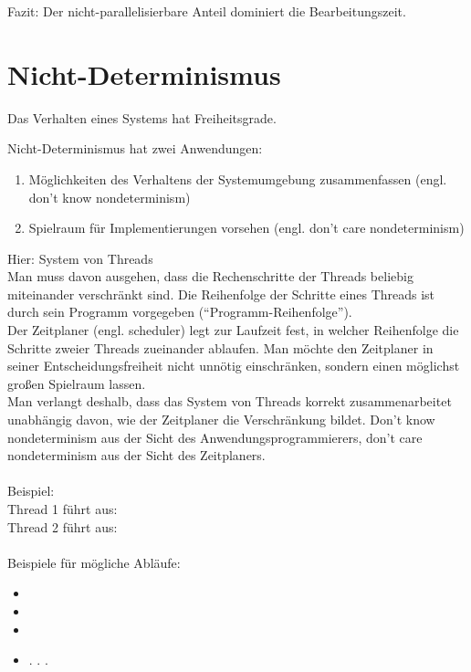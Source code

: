 Fazit: Der nicht-parallelisierbare Anteil dominiert die Bearbeitungszeit.

\section{Nicht-Determinismus}
\begin{definition}
Das Verhalten eines Systems hat Freiheitsgrade.
\end{definition}

Nicht-Determinismus hat zwei Anwendungen:
\begin{enumerate}
\item Möglichkeiten des Verhaltens der Systemumgebung zusammenfassen (engl. don't know nondeterminism)
\item Spielraum für Implementierungen vorsehen (engl. don't care nondeterminism)
\end{enumerate}

Hier: System von Threads\\
Man muss davon ausgehen, dass die Rechenschritte der Threads beliebig miteinander verschränkt sind. Die Reihenfolge der Schritte eines Threads ist durch sein Programm vorgegeben ("`Programm-Reihenfolge"').\\
Der Zeitplaner (engl. scheduler) legt zur Laufzeit fest, in welcher Reihenfolge die Schritte zweier Threads zueinander ablaufen. Man möchte den Zeitplaner in seiner Entscheidungsfreiheit nicht unnötig einschränken, sondern einen möglichst großen Spielraum lassen.\\
Man verlangt deshalb, dass das System von Threads korrekt zusammenarbeitet unabhängig davon, wie der Zeitplaner die Verschränkung bildet. Don't know nondeterminism aus der Sicht des Anwendungsprogrammierers, don't care nondeterminism aus der Sicht des Zeitplaners.\\
\\
Beispiel:\\
Thread 1 führt aus:   \\
Thread 2 führt aus:   \\
\\
Beispiele für mögliche Abläufe:
\begin{itemize}
\item {}     
\item {}     
\item {}     
\item . . .
\end{itemize}

